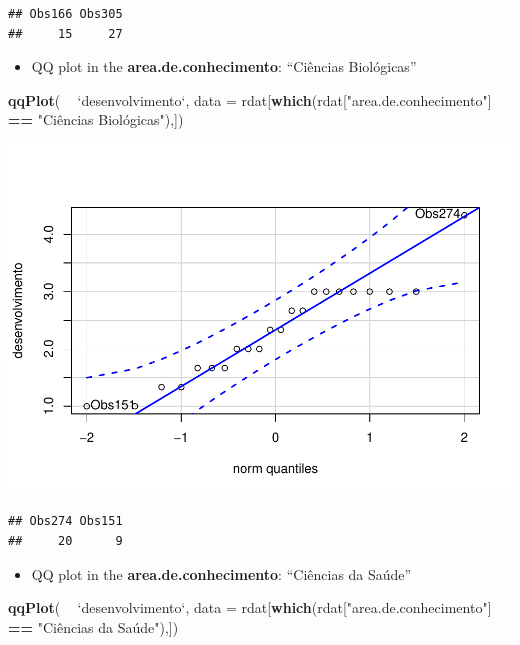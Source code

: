 \documentclass[]{article}
\newenvironment{Shaded}{\begin{snugshade}}{\end{snugshade}}
\newcommand{\DataTypeTok}[1]{\textcolor[rgb]{0.13,0.29,0.53}{#1}}
\newcommand{\KeywordTok}[1]{\textcolor[rgb]{0.13,0.29,0.53}{\textbf{#1}}}
\newcommand{\NormalTok}[1]{#1}
\newcommand{\OperatorTok}[1]{\textcolor[rgb]{0.81,0.36,0.00}{\textbf{#1}}}
\newcommand{\StringTok}[1]{\textcolor[rgb]{0.31,0.60,0.02}{#1}}
\providecommand{\tightlist}{%
  \setlength{\itemsep}{0pt}\setlength{\parskip}{0pt}}
\begin{document}
\begin{verbatim}
## Obs166 Obs305 
##     15     27
\end{verbatim}

\begin{itemize}
\tightlist
\item
  QQ plot in the \textbf{area.de.conhecimento}: ``Ciências Biológicas''
\end{itemize}

\begin{Shaded}
\begin{Highlighting}[]
\KeywordTok{qqPlot}\NormalTok{( }\OperatorTok{~}\StringTok{ `}\DataTypeTok{desenvolvimento}\StringTok{`}\NormalTok{, }\DataTypeTok{data =}\NormalTok{ rdat[}\KeywordTok{which}\NormalTok{(rdat[}\StringTok{"area.de.conhecimento"}\NormalTok{] }\OperatorTok{==}\StringTok{ "Ciências Biológicas"),])}
\end{Highlighting}
\end{Shaded}

\includegraphics{factorialAnova_files/figure-latex/unnamed-chunk-10-1.pdf}

\begin{verbatim}
## Obs274 Obs151 
##     20      9
\end{verbatim}

\begin{itemize}
\tightlist
\item
  QQ plot in the \textbf{area.de.conhecimento}: ``Ciências da Saúde''
\end{itemize}

\begin{Shaded}
\begin{Highlighting}[]
\KeywordTok{qqPlot}\NormalTok{( }\OperatorTok{~}\StringTok{ `}\DataTypeTok{desenvolvimento}\StringTok{`}\NormalTok{, }\DataTypeTok{data =}\NormalTok{ rdat[}\KeywordTok{which}\NormalTok{(rdat[}\StringTok{"area.de.conhecimento"}\NormalTok{] }\OperatorTok{==}\StringTok{ "Ciências da Saúde"),])}
\end{Highlighting}
\end{Shaded}
\end{document}
